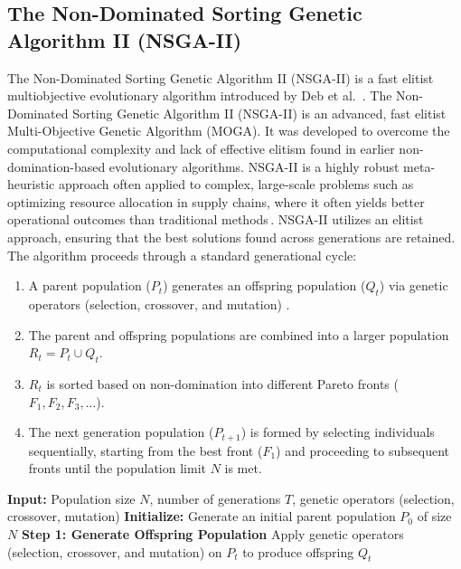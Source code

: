 \documentclass[11pt,pdflatex,sn-mathphys-ay]{sn-jnl}%
\theoremstyle{definition}
\theoremstyle{thmstyleone}%
\theoremstyle{thmstyletwo}%
\theoremstyle{thmstylethree}%
\begin{document}
\begin{appendices}
		\subsection{The Non-Dominated Sorting Genetic Algorithm II (NSGA-II)}
		The Non-Dominated Sorting Genetic Algorithm II (NSGA-II) is a fast elitist multiobjective evolutionary algorithm introduced by Deb et al.~\cite{deb2002fast}. The Non-Dominated Sorting Genetic Algorithm II (NSGA-II) is an advanced, fast elitist Multi-Objective Genetic Algorithm (MOGA). It was developed to overcome the computational complexity and lack of effective elitism found in earlier non-domination-based evolutionary algorithms. NSGA-II is a highly robust meta-heuristic approach often applied to complex, large-scale problems such as optimizing resource allocation in supply chains, where it often yields better operational outcomes than traditional methods\,\cite{acerce2025application}. 
		NSGA-II utilizes an elitist approach, ensuring that the best solutions found across generations are retained. The algorithm proceeds through a standard generational cycle:
		\begin{enumerate}[leftmargin=*]
			\item A parent population ($P_t$) generates an offspring population ($Q_t$) via genetic operators (selection, crossover, and mutation) \cite{acerce2025application}.
			\item The parent and offspring populations are combined into a larger population $R_t = P_t \cup Q_t$.
			\item $R_t$ is sorted based on non-domination into different Pareto fronts ($F_1, F_2, F_3, \dots$).
			\item The next generation population ($P_{t+1}$) is formed by selecting individuals sequentially, starting from the best front ($F_1$) and proceeding to subsequent fronts until the population limit $N$ is met.
		\end{enumerate}
		\begin{algorithm}[H]
			\caption{Non-dominated Sorting Genetic Algorithm II (NSGA-II)}
			\begin{algorithmic}[1]
				\STATE \textbf{Input:} Population size $N$, number of generations $T$, genetic operators (selection, crossover, mutation)
				\STATE \textbf{Initialize:} Generate an initial parent population $P_0$ of size $N$
				\STATE \textbf{Step 1: Generate Offspring Population}
				\STATE \hspace{1em} Apply genetic operators (selection, crossover, and mutation) on $P_t$ to produce offspring $Q_t$

\end{algorithmic}
\end{algorithm}
\end{appendices}
\end{document}
